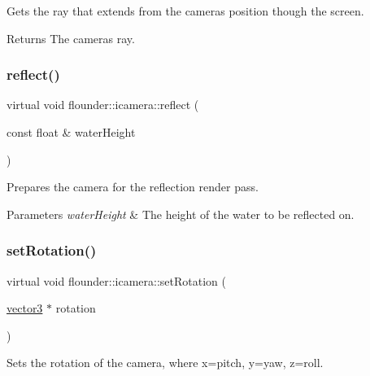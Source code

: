 Gets the ray that extends from the cameras position though the screen. 

\begin{DoxyReturn}{Returns}
The cameras ray. 
\end{DoxyReturn}
\mbox{\label{classflounder_1_1icamera_a20ee0d37d318012ac51e132ed02af6da}} 
\subsubsection{\texorpdfstring{reflect()}{reflect()}}
{\footnotesize\ttfamily virtual void flounder\+::icamera\+::reflect (\begin{DoxyParamCaption}\item[{const float \&}]{water\+Height }\end{DoxyParamCaption})\hspace{0.3cm}{\ttfamily [pure virtual]}}



Prepares the camera for the reflection render pass. 


\begin{DoxyParams}{Parameters}
{\em water\+Height} & The height of the water to be reflected on. \\
\hline
\end{DoxyParams}
\mbox{\label{classflounder_1_1icamera_abe51adbcadd5533bb1cd074d05179cd4}} 
\subsubsection{\texorpdfstring{set\+Rotation()}{setRotation()}}
{\footnotesize\ttfamily virtual void flounder\+::icamera\+::set\+Rotation (\begin{DoxyParamCaption}\item[{\hyperlink{classflounder_1_1vector3}{vector3} $\ast$}]{rotation }\end{DoxyParamCaption})\hspace{0.3cm}{\ttfamily [pure virtual]}}



Sets the rotation of the camera, where x=pitch, y=yaw, z=roll. 


